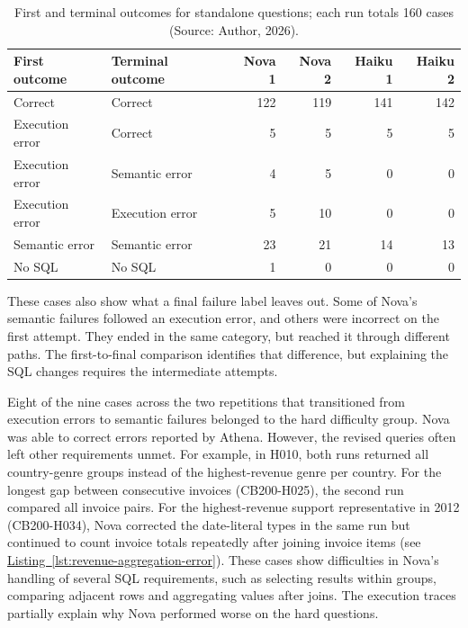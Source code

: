 \begin{table}[H]
\centering
{\small
\setlength{\tabcolsep}{4pt}
\begin{tabularx}{\textwidth}{@{}>{\raggedright\arraybackslash}X>{\raggedright\arraybackslash}Xrrrr@{}}
\toprule
\textbf{First outcome} & \textbf{Terminal outcome} & \textbf{Nova 1} & \textbf{Nova 2} & \textbf{Haiku 1} & \textbf{Haiku 2} \\
\midrule
Correct & Correct & 122 & 119 & 141 & 142 \\
\addlinespace[0.4em]
Execution error & Correct & 5 & 5 & 5 & 5 \\
\addlinespace[0.4em]
Execution error & Semantic error & 4 & 5 & 0 & 0 \\
\addlinespace[0.4em]
Execution error & Execution error & 5 & 10 & 0 & 0 \\
\addlinespace[0.4em]
Semantic error & Semantic error & 23 & 21 & 14 & 13 \\
\addlinespace[0.4em]
No SQL & No SQL & 1 & 0 & 0 & 0 \\
\bottomrule
\end{tabularx}
}
\caption{First and terminal outcomes for standalone questions; each run totals 160 cases (Source: Author, 2026).}
\label{tab:first-terminal-outcomes}
\end{table}

These cases also show what a final failure label leaves out.
Some of Nova's semantic failures followed an execution error, and others were
incorrect on the first attempt. 
They ended in the same category, but reached it through different paths.
The first-to-final comparison identifies that difference, 
but explaining the SQL changes requires the intermediate attempts.

Eight of the nine cases across the two repetitions that transitioned
from execution errors to semantic failures belonged to the hard difficulty group.
Nova was able to correct errors reported by Athena.
However, the revised queries often left other requirements unmet.
For example, in H010, both runs returned all country-genre groups instead
of the highest-revenue genre per country.
For the longest gap between consecutive invoices (CB200-H025), 
the second run compared all invoice pairs.
For the highest-revenue support representative in 2012 (CB200-H034), 
Nova corrected the date-literal types in the same run but continued
to count invoice totals repeatedly after joining invoice items
(see \hyperref[lst:revenue-aggregation-error]{Listing~\ref*{lst:revenue-aggregation-error}}).
These cases show difficulties in Nova's handling of several SQL requirements, 
such as selecting results within groups, 
comparing adjacent rows and aggregating values after joins. 
The execution traces partially explain why Nova performed worse on the hard questions.


